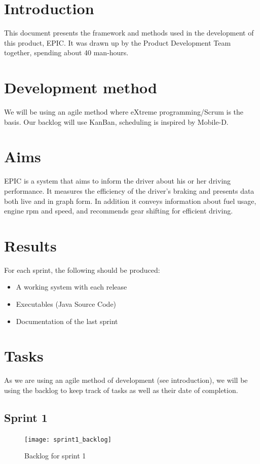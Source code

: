 \documentclass[a4paper,12pt]{article}
\begin{document}
\section{Introduction}
This document presents the framework and methods used in the development of this product, EPIC. It was drawn up by the Product Development Team together, spending about 40 man-hours.


\section{Development method}
We will be using an agile method where eXtreme programming/Scrum is the basis. Our backlog will use KanBan, scheduling is inspired by Mobile-D.

\section{Aims}
EPIC is a system that aims to inform the driver about his or her driving performance. It measures the efficiency of the driver’s braking and presents data both live and in graph form. In addition it conveys information about fuel usage, engine rpm and speed, and recommends gear shifting for efficient driving.

\section{Results}
For each sprint, the following should be produced:
\begin{itemize}
	\item A working system with each release
	\item Executables (Java Source Code)
	\item Documentation of the last sprint
\end{itemize}

\section{Tasks}
As we are using an agile method of development (see introduction), we will be using the backlog to keep track of tasks as well as their date of completion.

\subsection{Sprint 1}
\begin{figure}[H]
	\centering
	\texttt{[image: sprint1\_backlog]}
	\caption{Backlog for sprint 1}
\end{figure}
\end{document}
